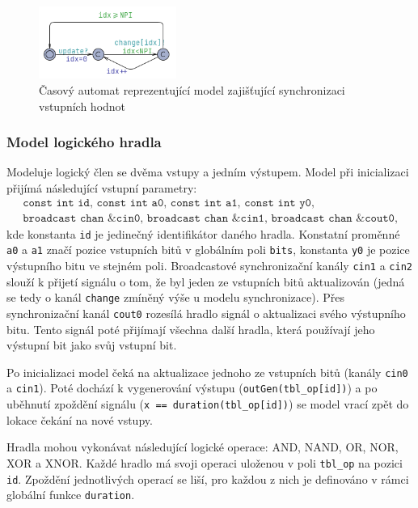 \begin{figure}[H]
    \centering
    \includegraphics[width=0.4\textwidth]{obrazky-figures/model_syncPrimary.png}
    \caption{Časový automat reprezentující model zajišťující synchronizaci vstupních hodnot}
    \label{fig:model_syncPrimary}
\end{figure}

\subsubsection{Model logického hradla}
Modeluje logický člen se dvěma vstupy a jedním výstupem. Model při inicializaci přijímá následující vstupní parametry:
\begin{equation*}
    \begin{array}{l}
       \texttt{const int id, const int a0, const int a1, const int y0,} \\
       \texttt{broadcast chan \&cin0, broadcast chan \&cin1, broadcast chan \&cout0,}
    \end{array}
\end{equation*}
kde konstanta \texttt{id} je jedinečný identifikátor daného hradla. Konstatní proměnné \texttt{a0} a \texttt{a1} značí pozice vstupních bitů v globálním poli \texttt{bits}, konstanta \texttt{y0} je pozice výstupního bitu ve stejném poli. Broadcastové synchronizační kanály \texttt{cin1} a \texttt{cin2} slouží k přijetí signálu o tom, že byl jeden ze vstupních bitů aktualizován (jedná se tedy o kanál \texttt{change} zmíněný výše u modelu synchronizace). Přes synchronizační kanál \texttt{cout0} rozesílá hradlo signál o aktualizaci svého výstupního bitu. Tento signál poté přijímají všechna další hradla, která používají jeho výstupní bit jako svůj vstupní bit.

Po inicializaci model čeká na aktualizace jednoho ze vstupních bitů (kanály \texttt{cin0} a \texttt{cin1}). Poté dochází k vygenerování výstupu (\texttt{outGen(tbl\_op[id])}) a po uběhnutí zpoždění signálu (\texttt{x == duration(tbl\_op[id])}) se model vrací zpět do lokace čekání na nové vstupy.

Hradla mohou vykonávat následující logické operace: AND, NAND, OR, NOR, XOR a XNOR. Každé hradlo má svoji operaci uloženou v poli \texttt{tbl\_op} na pozici \texttt{id}. Zpoždění jednotlivých operací se liší, pro každou z nich je definováno v rámci globální funkce \texttt{duration}.

